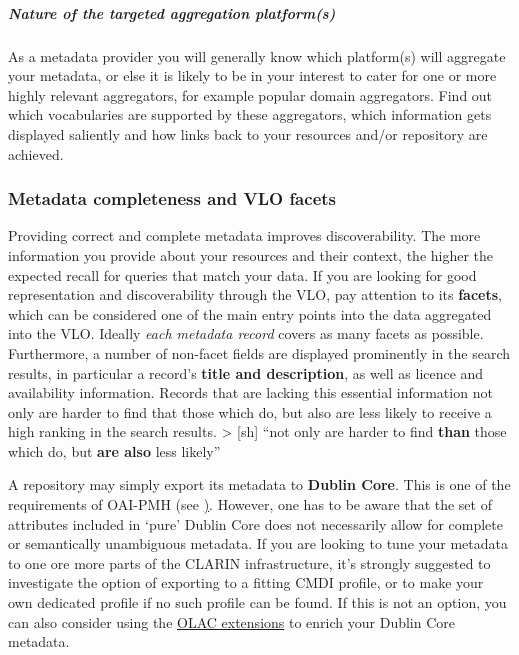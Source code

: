 \documentclass[]{article}
\let\oldsubparagraph\subparagraph
\renewcommand{\subparagraph}[1]{\oldsubparagraph{#1}\mbox{}}
\begin{document}
\subparagraph{Nature of the targeted aggregation
platform(s)}\label{nature-of-the-targeted-aggregation-platforms}

As a metadata provider you will generally know which platform(s) will
aggregate your metadata, or else it is likely to be in your interest to
cater for one or more highly relevant aggregators, for example popular
domain aggregators. Find out which vocabularies are supported by these
aggregators, which information gets displayed saliently and how links
back to your resources and/or repository are achieved.

\subsubsection{Metadata completeness and VLO
facets}\label{metadata-completeness-and-vlo-facets}

Providing correct and complete metadata improves discoverability. The
more information you provide about your resources and their context, the
higher the expected recall for queries that match your data. If you are
looking for good representation and discoverability through the VLO, pay
attention to its \textbf{facets}, which can be considered one of the
main entry points into the data aggregated into the VLO. Ideally
\emph{each metadata record} covers as many facets as possible.
Furthermore, a number of non-facet fields are displayed prominently in
the search results, in particular a record's \textbf{title and
description}, as well as licence and availability information. Records
that are lacking this essential information not only are harder to find
that those which do, but also are less likely to receive a high ranking
in the search results. \textgreater{} {[}sh{]} ``not only are harder to
find \textbf{than} those which do, but \textbf{are also} less likely''

A repository may simply export its metadata to \textbf{Dublin Core}.
This is one of the requirements of OAI-PMH (see
\href{https://www.openarchives.org/OAI/2.0/openarchivesprotocol.2015-01-08.htm\#Record}).
However, one has to be aware that the set of attributes included in
`pure' Dublin Core does not necessarily allow for complete or
semantically unambiguous metadata. If you are looking to tune your
metadata to one ore more parts of the CLARIN infrastructure, it's
strongly suggested to investigate the option of exporting to a fitting
CMDI profile, or to make your own dedicated profile if no such profile
can be found. If this is not an option, you can also consider using the
\href{http://www.language-archives.org/OLAC/metadata.html}{OLAC
extensions} to enrich your Dublin Core metadata.
\end{document}
